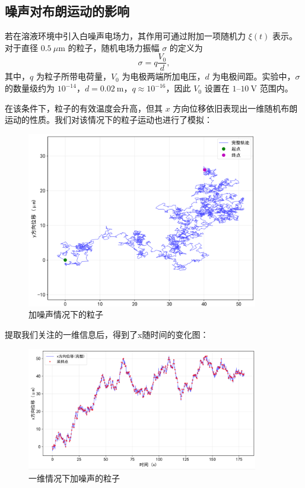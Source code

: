 \documentclass[a4paper]{report} %
\begin{document}
\subsection{噪声对布朗运动的影响}

若在溶液环境中引入白噪声电场力，其作用可通过附加一项随机力 $\xi(t)$ 表示。对于直径 $0.5~\mu\text{m}$ 的粒子，随机电场力振幅 $\sigma$ 的定义为
\begin{equation}
  \sigma = q \frac{V_0}{d},
\end{equation}
其中，$q$ 为粒子所带电荷量，$V_0$ 为电极两端所加电压，$d$ 为电极间距。实验中，$\sigma$ 的数量级约为 $10^{-14}$，$d = 0.02~\text{m}$，$q \approx 10^{-16}$，因此 $V_0$ 设置在 $1$--$10~\text{V}$ 范围内。

在该条件下，粒子的有效温度会升高，但其 $x$ 方向位移依旧表现出一维随机布朗运动的性质。我们对该情况下的粒子运动也进行了模拟：
\begin{figure}[H]
  \centering
  \includegraphics[width=0.9\textwidth]{一维位移.png}
  \caption{加噪声情况下的粒子}
  \label{fig:一维位移}
\end{figure}
提取我们关注的一维信息后，得到了x随时间的变化图：
\begin{figure}[H]
  \centering
  \includegraphics[width=0.9\textwidth]{x.png}
  \caption{一维情况下加噪声的粒子}
\end{figure}
\end{document}
